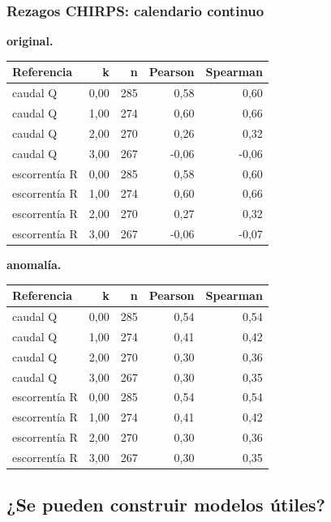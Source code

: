 \documentclass[10pt,a4paper]{article}
\begin{document}
\subsubsection*{Rezagos CHIRPS: calendario continuo}
\textbf{original.}\begin{center}\small\begin{tabular}{lrrrr}\hline
Referencia & k & n & Pearson & Spearman \\ \hline
caudal Q & 0,00 & 285 & 0,58 & 0,60 \\
caudal Q & 1,00 & 274 & 0,60 & 0,66 \\
caudal Q & 2,00 & 270 & 0,26 & 0,32 \\
caudal Q & 3,00 & 267 & -0,06 & -0,06 \\
escorrentía R & 0,00 & 285 & 0,58 & 0,60 \\
escorrentía R & 1,00 & 274 & 0,60 & 0,66 \\
escorrentía R & 2,00 & 270 & 0,27 & 0,32 \\
escorrentía R & 3,00 & 267 & -0,06 & -0,07 \\
\hline\end{tabular}\end{center}
\textbf{anomalía.}\begin{center}\small\begin{tabular}{lrrrr}\hline
Referencia & k & n & Pearson & Spearman \\ \hline
caudal Q & 0,00 & 285 & 0,54 & 0,54 \\
caudal Q & 1,00 & 274 & 0,41 & 0,42 \\
caudal Q & 2,00 & 270 & 0,30 & 0,36 \\
caudal Q & 3,00 & 267 & 0,30 & 0,35 \\
escorrentía R & 0,00 & 285 & 0,54 & 0,54 \\
escorrentía R & 1,00 & 274 & 0,41 & 0,42 \\
escorrentía R & 2,00 & 270 & 0,30 & 0,36 \\
escorrentía R & 3,00 & 267 & 0,30 & 0,35 \\
\hline\end{tabular}\end{center}

\subsection{¿Se pueden construir modelos útiles?}
\end{document}
